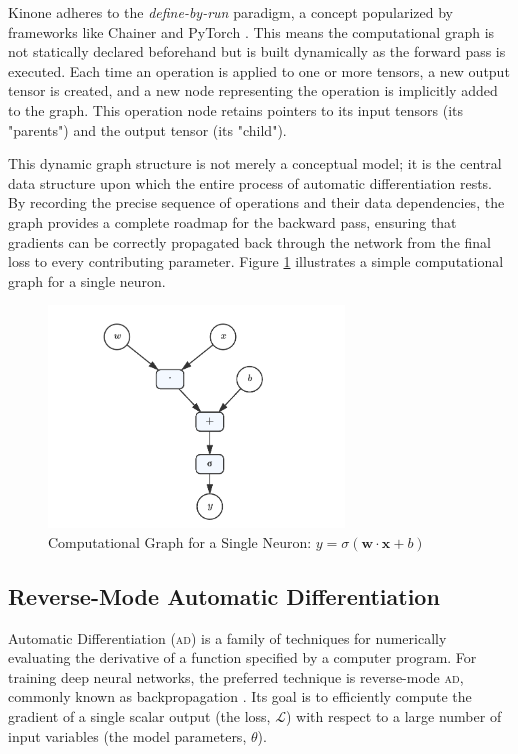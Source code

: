 \documentclass[a4paper]{article}
\newcommand{\acronym}[1]{\textsc{#1}}
\begin{document}
Kinone adheres to the \textit{define-by-run} paradigm, a concept popularized by frameworks like Chainer and PyTorch \cite{paszke2019pytorch}. This means the computational graph is not statically declared beforehand but is built dynamically as the forward pass is executed. Each time an operation is applied to one or more tensors, a new output tensor is created, and a new node representing the operation is implicitly added to the graph. This operation node retains pointers to its input tensors (its "parents") and the output tensor (its "child").

This dynamic graph structure is not merely a conceptual model; it is the central data structure upon which the entire process of automatic differentiation rests. By recording the precise sequence of operations and their data dependencies, the graph provides a complete roadmap for the backward pass, ensuring that gradients can be correctly propagated back through the network from the final loss to every contributing parameter. Figure \ref{fig:comp_graph_nn} illustrates a simple computational graph for a single neuron.

\begin{figure}[h!]
    \centering
    \includegraphics[width=0.7\textwidth]{comp_graph_nn}
    \caption{Computational Graph for a Single Neuron: \(y = \sigma(\mathbf{w}\cdot \mathbf{x} + b)\)}
    \label{fig:comp_graph_nn}
\end{figure}

\subsection{Reverse-Mode Automatic Differentiation}

Automatic Differentiation (\acronym{ad}) is a family of techniques for numerically evaluating the derivative of a function specified by a computer program. For training deep neural networks, the preferred technique is reverse-mode \acronym{ad}, commonly known as backpropagation \cite{rumelhart1986learning}. Its goal is to efficiently compute the gradient of a single scalar output (the loss, $\mathcal{L}$) with respect to a large number of input variables (the model parameters, $\theta$).
\end{document}

